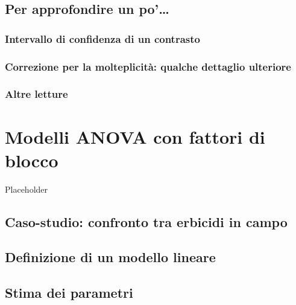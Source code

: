 \documentclass[a4paper,12pt,oneside]{book}
\begin{document}
\hypertarget{per-approfondire-un-po-7}{%
\section{Per approfondire un po'\ldots{}}\label{per-approfondire-un-po-7}}

\hypertarget{intervallo-di-confidenza-di-un-contrasto}{%
\subsection{Intervallo di confidenza di un contrasto}\label{intervallo-di-confidenza-di-un-contrasto}}

\hypertarget{correzione-per-la-molteplicita-qualche-dettaglio-ulteriore}{%
\subsection{Correzione per la molteplicità: qualche dettaglio ulteriore}\label{correzione-per-la-molteplicita-qualche-dettaglio-ulteriore}}

\hypertarget{altre-letture-4}{%
\subsection{Altre letture}\label{altre-letture-4}}

\hypertarget{modelli-anova-con-fattori-di-blocco}{%
\chapter{Modelli ANOVA con fattori di blocco}\label{modelli-anova-con-fattori-di-blocco}}

Placeholder

\hypertarget{caso-studio-confronto-tra-erbicidi-in-campo}{%
\section{Caso-studio: confronto tra erbicidi in campo}\label{caso-studio-confronto-tra-erbicidi-in-campo}}

\hypertarget{definizione-di-un-modello-lineare-1}{%
\section{Definizione di un modello lineare}\label{definizione-di-un-modello-lineare-1}}

\hypertarget{stima-dei-parametri-1}{%
\section{Stima dei parametri}\label{stima-dei-parametri-1}}
\end{document}
